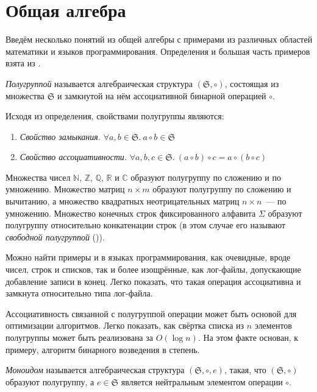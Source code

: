 \section{Общая алгебра}
Введём несколько понятий из общей алгебры с примерами из различных областей математики и языков программирования. Определения и большая часть примеров взята из \cite{jacobson2012basic}.

\begin{definition}
  \emph{Полугруппой} называется алгебраическая структура $(\mathfrak{S}, \circ)$, состоящая из множества $\mathfrak{S}$ и замкнутой на нём ассоциативной бинарной операцией $\circ$.
\end{definition}

Исходя из определения, свойствами полугруппы являются:
\begin{enumerate}
 \item \emph{Свойство замыкания.} $\forall a, b \in \mathfrak{S}.~ a \circ b \in \mathfrak{S}$
 \item \emph{Свойство ассоциативности.} $\forall a, b, c \in \mathfrak{S}.~ (a \circ b) \circ c = a \circ (b \circ c)$
\end{enumerate}

Множества чисел $\mathbb{N}$, $\mathbb{Z}$, $\mathbb{Q}$, $\mathbb{R}$ и $\mathbb{C}$ образуют полугруппу по сложению и по умножению. Множество матриц $n \times m$ образуют полугруппу по сложению и вычитанию, а множество квадратных неотрицательных матриц $n \times n$~--- по умножению. Множество конечных строк фиксированного алфавита $\Sigma$ образуют полугруппу относительно конкатенации строк (в этом случае его называют \emph{свободной полугруппой} ()).

Можно найти примеры и в языках программирования, как очевидные, вроде чисел, строк и списков, так и более изощрённые, как лог-файлы, допускающие добавление записи в конец. Легко показать, что такая операция ассоциативна и замкнута относительно типа лог-файла.

Ассоциативность связанной с полугруппой операции может быть основой для оптимизации алгоритмов. Легко показать, как свёртка списка из $n$ элементов полугруппы может быть реализована за $O(\log n)$. На этом факте основан, к примеру, алгоритм бинарного возведения в степень.

\begin{definition}
   \emph{Моноидом} называется алгебраическая структура $(\mathfrak{S}, \circ, e)$, такая, что $(\mathfrak{S}, \circ)$ образуют полугруппу, а $e \in \mathfrak{S}$ является нейтральным элементом операции $\circ$.
\end{definition}

